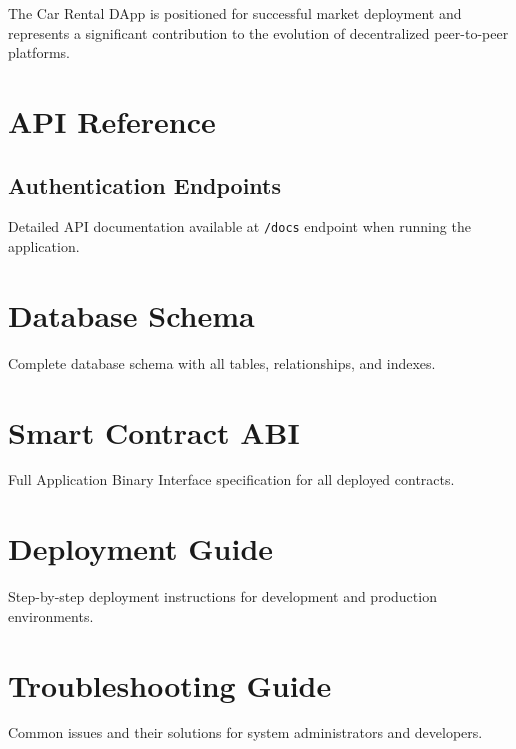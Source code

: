 \documentclass[12pt,a4paper]{article}
\begin{document}
The Car Rental DApp is positioned for successful market deployment and represents a significant contribution to the evolution of decentralized peer-to-peer platforms.

\newpage
\appendix

\section{API Reference}
\subsection{Authentication Endpoints}
Detailed API documentation available at \texttt{/docs} endpoint when running the application.

\section{Database Schema}
Complete database schema with all tables, relationships, and indexes.

\section{Smart Contract ABI}
Full Application Binary Interface specification for all deployed contracts.

\section{Deployment Guide}
Step-by-step deployment instructions for development and production environments.

\section{Troubleshooting Guide}
Common issues and their solutions for system administrators and developers.
\end{document}

